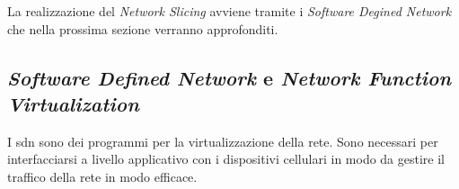 La realizzazione del \textit{Network Slicing} avviene tramite i \textit{Software Degined Network} che nella prossima sezione verranno approfonditi.

\clearpage

\subsection{\textit{Software Defined Network} e  \textit{Network Function Virtualization}}
I \gls{sdn} sono dei programmi per la virtualizzazione della rete. Sono necessari per interfacciarsi a livello applicativo con i dispositivi cellulari 
in modo da gestire il traffico della rete in modo efficace\cite{5g-sdn}.